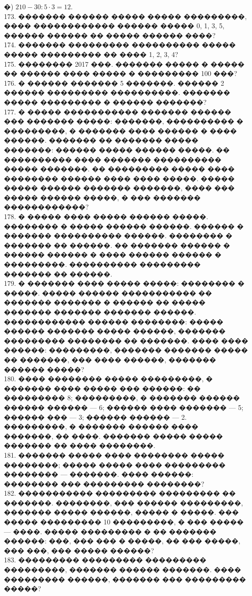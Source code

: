 \documentclass[12pt]{article}
\begin{document}
�) $210-30:5\cdot3=12.$\\
173. ������� ������ ����� ����� ���������, ���� ������������ ������ ����� 0, 1, 3, 5, ������ ������ �� ����� ������ ����?\\
174. ������� ��������� ���������� ����� ����� ��������� �� ���� 1, 2, 3, 4?\\
175. �������� 2017 ���. ������� ����� � ����� �� ������ ���� ����� � ��������� 100 ���?\\
176. � ������ ������� 5 �������. ������ 2 ������ ��������� ����������. ������� ����� ��������� � ������ �������?\\
177. � ����� ����������� ������� ������ ��� ������� �����: �������, ���������� � ���������, � ������� ���� ������ � ���� ������. ������� �� ������� ����� �������: ������ ����� ������ �����. �� ���������� ���� ������� ���������� ����� �������. �� ��������� ����� ���� �������� ������ ���� ���� �����. ����� ����� ������ ������� �������, ���� ��� ����� ������ �����, � ��� ������� ������������?\\
178. � ����� ���� ����� ������ �����. �������� � ����� ������ ������. ������ � ������� ���������� ������. �������� � ������� �� ������. �� ������� ������ � ������ ������ � ���� ������ ������ � ���������. ���������� ��������� ������� �� ������.\\
179. � ������� ���� ����� �����: �������� � �����. ����� ������ ����������� �� ������� ������� � ������ �� ����� ������� ������� ������� ������. ������������ ������ ��������: ����� ������ ������� ����� ������, ������� ��������� �������� �� �������. ���� ���� ������: ���������, ������� ������� ����� �� �������, ��� ���� ������, ������� ������ �����?\\
180. ���� �������� ����� ���������, � ������� ���� ����� ��� ������: �� ��������� 8; ���������, � ������� ������ ������ ������ --- 6; ������ ���� ������� --- 5; ������ ��� --- 3; ������ ������ --- 2. ���������, � ������� ������ ���� �������, �� ����. ������� ����� ����� ������� �� ���� ��������.\\
181. ������� ����� ���� �������� ����� ��������; ����� ����� ���� ��������� �������� --- �������. ���� ������: �������� ��� ��������� ��������?\\
182. ����������� ��������� ��������� �� �������. ��������, ��� ������ ���������, ������� ����� ������, ����� � �����. ��� ����� ��������� 10 ���������, � ��� ����� --- ����. ����� ��������� � �� ������� ������: ���, ��� ��� � �����, �� ��� �����, ��� ���, ��� ����� ������?\\
183. ��������� ��������� ��������� ���������, ������� ������ �������. ���� ��������� ������, ������� ��� ��������� �����?\\
\end{document}
